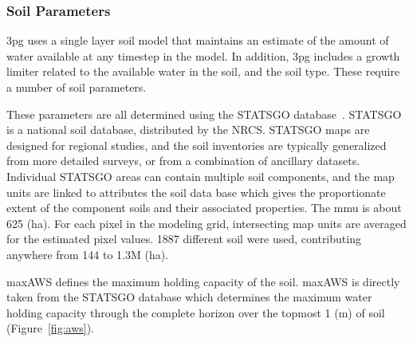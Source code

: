 \documentclass[preprint,12pt]{elsarticle}
\begin{document}
\subsubsection{Soil Parameters}
\label{sec:soil}

\ac{3pg} uses a single layer soil model that maintains an estimate of
the amount of water available at any timestep in the model.  In
addition, \ac{3pg} includes a growth limiter related to the available
water in the soil, and the soil type.  These require a number of soil
parameters.

These parameters are all determined using the \acf{STATSGO}
database~\cite{SoilSurveyStaff2012-STATSGO}.  \ac{STATSGO} is a
national soil database, distributed by the \ac{NRCS}.  \ac{STATSGO}
maps are designed for regional studies, and the soil inventories are
typically generalized from more detailed surveys, or from a
combination of ancillary datasets.  Individual \ac{STATSGO} areas can
contain multiple soil components, and the map units are linked to
attributes the soil data base which gives the proportionate extent of
the component soils and their associated properties.  The \ac{mmu} is
about 625 (ha).  For each pixel in the modeling grid, intersecting map
units are averaged for the estimated pixel values.  1887 different
soil were used, contributing anywhere from 144 to 1.3M (ha).

\ac{maxAWS} defines the maximum holding capacity of the soil.
\ac{maxAWS} is directly taken from the \ac{STATSGO} database which
determines the maximum water holding capacity through the complete
horizon over the topmost 1 (m) of soil (Figure~\ref{fig:aws}).
\end{document}
